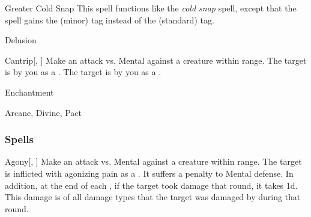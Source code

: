 \lowercase{\hypertarget{spell:Greater Cold Snap}{}}\label{spell:Greater Cold Snap}
\begin{ability}[\nth{4}]{\hypertarget{spell:Greater Cold Snap}{Greater Cold Snap}}
This spell functions like the \textit{cold snap} spell, except that the spell gains the  (minor) tag instead of the  (standard) tag.
\end{ability}
\vspace{0.25em}


\newpage
\begin{spellsection}{Delusion}

\begin{spellheader}
\end{spellheader}


\begin{ability}{Cantrip}[, ]
Make an attack vs. Mental against a creature within \rngmed range.
\hit The target is  by you as a .
\crit The target is  by you as a .
\end{ability}




 Enchantment

 Arcane, Divine, Pact
\end{spellsection}


\subsubsection{Spells}


\lowercase{\hypertarget{spell:Agony}{}}\label{spell:Agony}
\begin{ability}[\nth{1}]{\hypertarget{spell:Agony}{Agony}}[, ]
Make an attack vs. Mental against a creature within \rngmed range.
\hit The target is inflicted with agonizing pain as a .
It suffers a  penalty to Mental defense.
In addition, at the end of each , if the target took damage that round, it takes  \minus1d.
This damage is of all damage types that the target was damaged by during that round.
\end{ability}
\vspace{0.25em}



